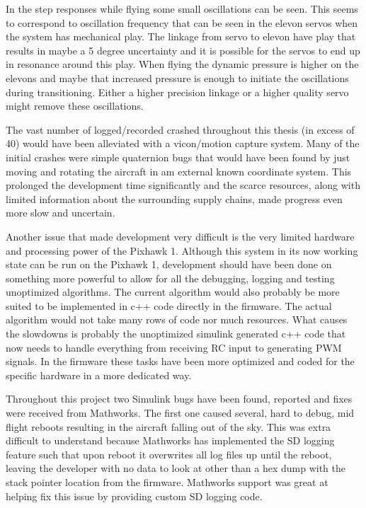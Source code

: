 \documentclass{article}
\begin{document}
In the step responses while flying some small oscillations can be seen.
This seems to correspond to oscillation frequency that can be seen in the elevon servos when the system has mechanical play.
The linkage from servo to elevon have play that results in maybe a 5 degree uncertainty and it is possible for the servos to end up in resonance around this play.
When flying the dynamic pressure is higher on the elevons and maybe that increased pressure is enough to initiate the oscillations during transitioning.
Either a higher precision linkage or a higher quality servo might remove these oscillations.

The vast number of logged/recorded crashed throughout this thesis (in excess of 40) would have been alleviated with a vicon/motion capture system.
Many of the initial crashes were simple quaternion bugs that would have been found by just moving and rotating the aircraft in am external known coordinate system.
This prolonged the development time significantly and the scarce resources, along with limited information about the surrounding supply chains, made progress even more slow and uncertain.

Another issue that made development very difficult is the very limited hardware and processing power of the Pixhawk 1.
Although this system in its now working state can be run on the Pixhawk 1, development should have been done on something more powerful to allow for all the debugging, logging and testing unoptimized algorithms.
The current algorithm would also probably be more suited to be implemented in c++ code directly in the firmware.
The actual algorithm would not take many rows of code nor much resources.
What causes the slowdowns is probably the unoptimized simulink generated c++ code that now needs to handle everything from receiving RC input to generating PWM signals.
In the firmware these tasks have been more optimized and coded for the specific hardware in a more dedicated way.

Throughout this project two Simulink bugs have been found, reported and fixes were received from Mathworks.
The first one caused several, hard to debug, mid flight reboots resulting in the aircraft falling out of the sky.
This was extra difficult to understand because Mathworks has implemented the SD logging feature such that upon reboot it overwrites all log files up until the reboot, leaving the developer with no data to look at other than a hex dump with the stack pointer location from the firmware.
Mathworks support was great at helping fix this issue by providing custom SD logging code.
\end{document}
